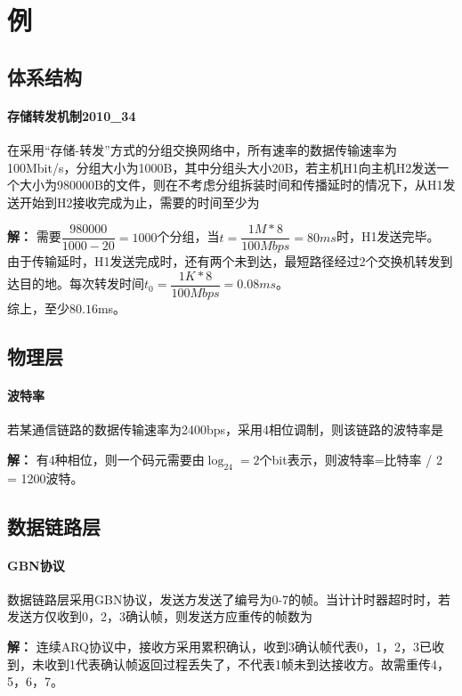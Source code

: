 
\chapter{例}

\section{体系结构}

\subsubsection{存储转发机制2010\_34}
在采用“存储-转发”方式的分组交换网络中，所有速率的数据传输速率为100Mbit/s，分组大小为1000B，其中分组头大小20B，若主机H1向主机H2发送一个大小为980000B的文件，则在不考虑分组拆装时间和传播延时的情况下，从H1发送开始到H2接收完成为止，需要的时间至少为

\textbf{解：}
需要\(\dfrac{980000}{1000 - 20} = 1000\)个分组，当\(t = \dfrac{1M * 8}{100Mbps} = 80ms\)时，H1发送完毕。 \\
由于传输延时，H1发送完成时，还有两个未到达，最短路径经过2个交换机转发到达目的地。每次转发时间\(t_0 = \dfrac{1K * 8}{100Mbps} = 0.08ms\)。 \\
综上，至少\(80.16\)ms。


\section{物理层}

\subsubsection{波特率}
若某通信链路的数据传输速率为2400bps，采用4相位调制，则该链路的波特率是

\textbf{解：}
有4种相位，则一个码元需要由\(\log_24=2\)个bit表示，则波特率=比特率 / 2 = 1200波特。


\section{数据链路层}

\subsubsection{GBN协议}
数据链路层采用GBN协议，发送方发送了编号为0-7的帧。当计计时器超时时，若发送方仅收到0，2，3确认帧，则发送方应重传的帧数为

\textbf{解：}
连续ARQ协议中，接收方采用累积确认，收到3确认帧代表0，1，2，3已收到，未收到1代表确认帧返回过程丢失了，不代表1帧未到达接收方。故需重传4，5，6，7。


